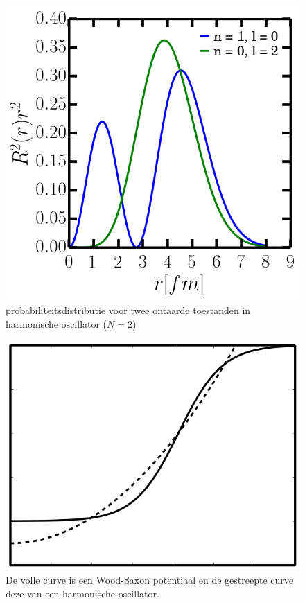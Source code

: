 \documentclass[12pt]{article}
\begin{document}
\begin{figure}
\centering
\includegraphics[scale=0.5]{waves.png}
\caption{probabiliteitsdistributie voor twee ontaarde toestanden in harmonische oscillator  ($N =2$)}
\label{fig:ho_waves}
\end{figure}

\begin{figure}
\centering
\includegraphics[scale=0.4]{Ar_potentiaal.png}
\caption{De volle curve is een Wood-Saxon potentiaal en de gestreepte curve deze van een harmonische oscillator.}
\label{fig:hows}
\end{figure}
\end{document}
